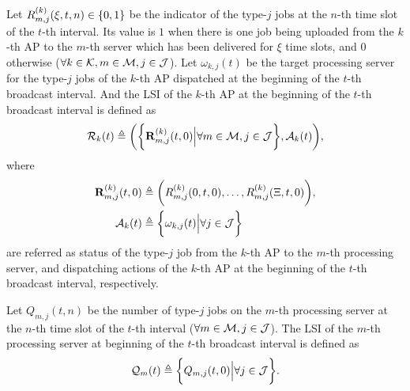 \begin{definition}
    Let $R^{(k)}_{m,j}(\xi,t,n) \in \{0,1\}$ be the indicator of the type-$j$ jobs at the $n$-th time slot of the $t$-th interval.
    Its value is $1$ when there is one job being uploaded from the $k$-th AP to the $m$-th server which has been delivered for $\xi$ time slots, and $0$ otherwise ($\forall k\in\mathcal{K}, m\in\mathcal{M}, j\in\mathcal{J}$).
    Let $\omega_{k,j}(t)$ be the target processing server for the type-$j$ jobs of the $k$-th AP dispatched at the beginning of the $t$-th broadcast interval.
    And the LSI of the $k$-th AP at the beginning of the $t$-th broadcast interval is defined as
    {\small
    \begin{align}
        \mathcal{R}_{k}(t) \triangleq
        \bigg(
            \bigg\{\mathbf{R}^{(k)}_{m,j}(t,0) \Big| \forall m\in\mathcal{M},j\in\mathcal{J}\bigg\},
            \mathcal{A}_{k}(t)
        \bigg),
    \end{align}
    }%
    where
    {\small
    \begin{align}
        \mathbf{R}^{(k)}_{m,j}(t,0) &\triangleq \bigg(
            R^{(k)}_{m,j}(0,t,0), \dots, R^{(k)}_{m,j}(\Xi,t,0)
        \bigg),
        \\
        \mathcal{A}_{k}(t) &\triangleq \bigg\{\omega_{k,j}(t) \Big| \forall j\in\mathcal{J}\bigg\}
    \end{align}
    }%
    are referred as status of the type-$j$ job from the $k$-th AP to the $m$-th processing server, and dispatching actions of the $k$-th AP at the beginning of the $t$-th broadcast interval, respectively. %
\end{definition}

\begin{definition}
    Let $Q_{m,j}({t,n})$ be the number of type-$j$ jobs on the $m$-th processing server at the $n$-th time slot of the $t$-th interval ($\forall m\in\mathcal{M}, j\in\mathcal{J}$).
    The LSI of the $m$-th processing server at beginning of the $t$-th broadcast interval is defined as
    {\small
    \begin{align}
        \mathcal{Q}_{m}(t) \triangleq \bigg\{
            Q_{m,j}(t, 0) \Big| \forall j\in\mathcal{J}
        \bigg\}.
    \end{align}
    }%
\end{definition}

